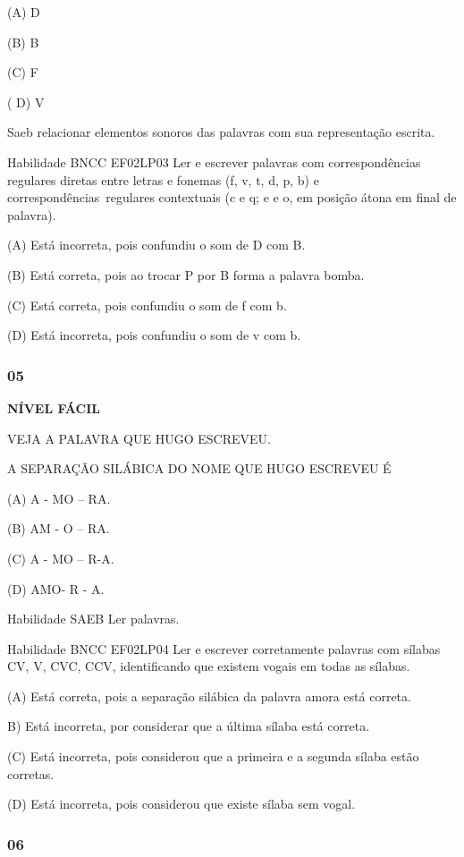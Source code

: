 (A) D

(B) B

(C) F

( D) V

Saeb relacionar elementos sonoros das palavras com sua representação
escrita.

Habilidade BNCC EF02LP03 Ler e escrever palavras com correspondências
regulares diretas entre letras e fonemas (f, v, t, d, p, b) e
correspondências~regulares contextuais (c e q; e e o, em posição átona
em final de palavra).

(A) Está incorreta, pois confundiu o som de D com B.

(B) Está correta, pois ao trocar P por B forma a palavra bomba.

(C) Está correta, pois confundiu o som de f com b.

(D) Está incorreta, pois confundiu o som de v com b.

\subsubsection{05}\label{section-115}

\textbf{NÍVEL FÁCIL}

VEJA A PALAVRA QUE HUGO ESCREVEU.

A SEPARAÇÃO SILÁBICA DO NOME QUE HUGO ESCREVEU É

(A) A - MO -- RA.

(B) AM - O -- RA.

(C) A - MO -- R-A.

(D) AMO- R - A.

\protect\hypertarget{_Hlk129375756}{}{}Habilidade SAEB Ler palavras.

Habilidade BNCC EF02LP04 Ler e escrever corretamente palavras com
sílabas CV, V, CVC, CCV, identificando que existem vogais em todas as
sílabas.

(A) Está correta, pois a separação silábica da palavra amora está
correta.

B) Está incorreta, por considerar que a última sílaba está correta.

(C) Está incorreta, pois considerou que a primeira e a segunda sílaba
estão corretas.

(D) Está incorreta, pois considerou que existe sílaba sem vogal.

\subsubsection{06 }\label{section-116}

